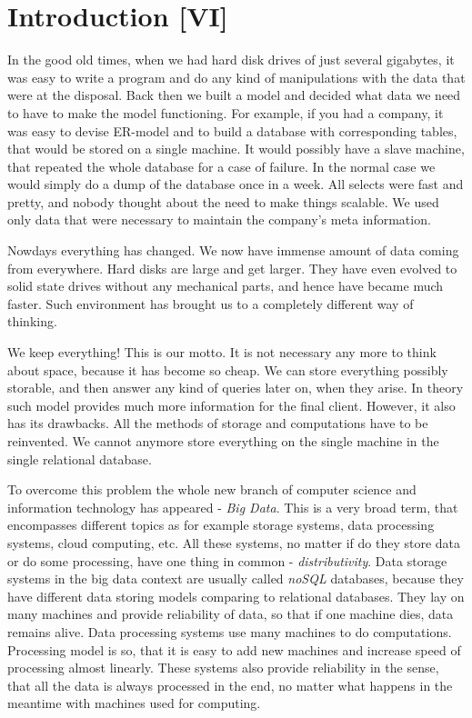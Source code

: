 \chapter{Introduction [VI]}
\label{chap:introduction}

In the good old times, when we had hard disk drives of just several gigabytes, it was easy to write a program and do any kind of manipulations with the data that were at the disposal.
Back then we built a model and decided what data we need to have to make the model functioning.
For example, if you had a company, it was easy to devise ER-model and to build a database with corresponding tables, that would be stored on a single machine.
It would possibly have a slave machine, that repeated the whole database for a case of failure.
In the normal case we would simply do a dump of the database once in a week.
All selects were fast and pretty, and nobody thought about the need to make things scalable.
We used only data that were necessary to maintain the company's meta information.

Nowdays everything has changed.
We now have immense amount of data coming from everywhere.
Hard disks are large and get larger.
They have even evolved to solid state drives without any mechanical parts, and hence have became much faster.
Such environment has brought us to a completely different way of thinking.

We keep everything!
This is our motto.
It is not necessary any more to think about space, because it has become so cheap.
We can store everything possibly storable, and then answer any kind of queries later on, when they arise.
In theory such model provides much more information for the final client.
However, it also has its drawbacks.
All the methods of storage and computations have to be reinvented.
We cannot anymore store everything on the single machine in the single relational database.

To overcome this problem the whole new branch of computer science and information technology has appeared - \textit{Big Data}.
This is a very broad term, that encompasses different topics as for example storage systems, data processing systems, cloud computing, etc.
All these systems, no matter if do they store data or do some processing, have one thing in common - \textit{distributivity}.
Data storage systems in the big data context are usually called \textit{noSQL} databases, because they have different data storing models comparing to relational databases.
They lay on many machines and provide reliability of data, so that if one machine dies, data remains alive.
Data processing systems use many machines to do computations.
Processing model is so, that it is easy to add new machines and increase speed of processing almost linearly.
These systems also provide reliability in the sense, that all the data is always processed in the end, no matter what happens in the meantime with machines used for computing.


